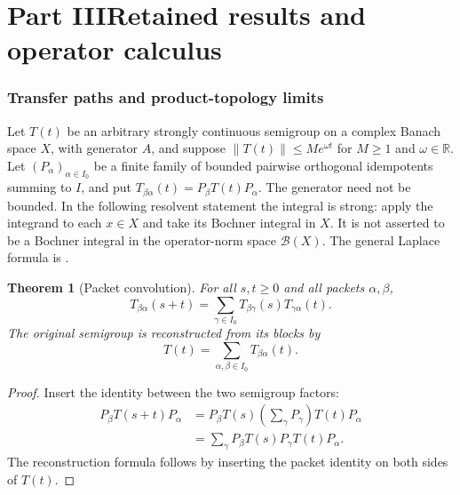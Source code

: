 \documentclass[11pt,letterpaper]{article}
\newtheorem{theorem}{Theorem}[section]
\theoremstyle{plain}
\theoremstyle{plain}
\theoremstyle{plain}
\theoremstyle{definition}
\theoremstyle{definition}
\theoremstyle{definition}
\theoremstyle{definition}
\theoremstyle{definition}
\theoremstyle{remark}
\theoremstyle{remark}
\theoremstyle{remark}
\theoremstyle{remark}
\theoremstyle{remark}
\newcommand{\norm}[1]{\left\lVert#1\right\rVert}
\theoremstyle{remark}
\let\KomorebiPrimitiveMathcal\mathcal
\renewcommand{\mathcal}[1]{{\KomorebiPrimitiveMathcal{#1}}}
\let\KomorebiPrimitivemathbb\mathbb
\renewcommand{\mathbb}[1]{{\KomorebiPrimitivemathbb{#1}}}
\begin{document}
\part*{Part III\quad Retained results and operator calculus}
\setcounter{section}{0}\setcounter{figure}{0}\setcounter{table}{0}
\renewcommand{\thesection}{R\arabic{section}}
\renewcommand{\theHsection}{R.\arabic{section}}
\renewcommand{\thefigure}{R\arabic{figure}}
\renewcommand{\theHfigure}{R.\arabic{figure}}
\renewcommand{\thetable}{R\arabic{table}}
\renewcommand{\theHtable}{R.\arabic{table}}
\FloatBarrier
\section{Transfer paths and product-topology limits}\label{earlier:section:01}
Let $T(t)$ be an arbitrary strongly continuous semigroup on a complex Banach space $X$, with generator $A$, and suppose $\norm{T(t)}\leq M e^{\omega t}$ for $M\geq1$ and $\omega\in\mathbb R$. Let $(P_\alpha)_{\alpha\in I_0}$ be a finite family of bounded pairwise orthogonal idempotents summing to $I$, and put $T_{\beta\alpha}(t)=P_\beta T(t)P_\alpha$. The generator need not be bounded. In the following resolvent statement the integral is strong: apply the integrand to each $x\in X$ and take its Bochner integral in $X$. It is not asserted to be a Bochner integral in the operator-norm space $\mathcal B(X)$. The general Laplace formula is \cite[Chapter II, Theorem 1.10]{EngelNagel2000}.
\begin{theorem}[Packet convolution]\label{earlier:record:001}\label{earlier:thm:packet_convolution}
For all \(s,t\geq0\) and all packets \(\alpha,\beta\),
\[
\boxed{
T_{\beta\alpha}(s+t)
=
\sum_{\gamma\in I_0}
T_{\beta\gamma}(s)T_{\gamma\alpha}(t).
}
\]
The original semigroup is reconstructed from its blocks by
\[
T(t)=\sum_{\alpha,\beta\in I_0}T_{\beta\alpha}(t).
\]
\end{theorem}

\begin{proof}
Insert the identity between the two semigroup factors:
\[
\begin{aligned}
P_\beta T(s+t)P_\alpha
&=P_\beta T(s)\left(\sum_\gamma P_\gamma\right)T(t)P_\alpha\\
&=\sum_\gamma
P_\beta T(s)P_\gamma T(t)P_\alpha.
\end{aligned}
\]
The reconstruction formula follows by inserting the packet identity on both sides of \(T(t)\).
\end{proof}
\end{document}
